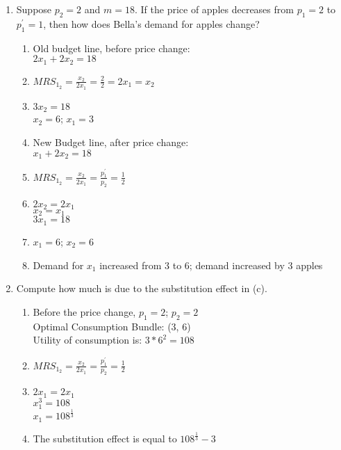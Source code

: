 \documentclass[11pt]{article}
\begin{document}
\begin{enumerate}
\begin{enumerate}
        \item Suppose $p_{2}=2$ and $m=18$. If the price of apples decreases from $p_{1}=2$ to $p_{1}^{\prime}=1$, then how does Bella's demand for apples change?
        \begin{enumerate}
            \item Old budget line, before price change:\\
            $2x_1 + 2x_2 = 18$
            \item $MRS_1_2 = \frac{x_2}{2x_1}=\frac{2}{2}=2x_1 = x_2$
            \item $3x_2 = 18$\\
            $x_2 = 6$; $x_1 = 3$
            \item New Budget line, after price change:\\
            $x_1 + 2x_2 = 18$
            \item $MRS_1_2 = \frac{x_2}{2x_1}=\frac{p_1^'}{p_2}=\frac{1}{2}$
            \item $2x_2 = 2x_1$\\$x_2 = x_1$\\
            $3x_1 = 18$
            \item $x_1 = 6$; $x_2 = 6$
            \item Demand for $x_1$ increased from 3 to 6; demand increased by 3 apples
        \end{enumerate}

        \item Compute how much is due to the substitution effect in (c).
        \begin{enumerate}
            \item Before the price change, $p_1 = 2$; $p_2 = 2$\\
            Optimal Consumption Bundle: (3, 6)\\
            Utility of consumption is: $3*6^2 = 108$
            \item $MRS_1_2 = \frac{x_2}{2x_1} = \frac{p_1^'}{p_2} = \frac{1}{2}$
            \item $2x_1 = 2x_1$\\
            $x_1^3 = 108$\\
            $x_1 = 108^{\frac{1}{3}}$
            \item The substitution effect is equal to $108^{\frac{1}{3}} - 3$
        \end{enumerate}

    \end{enumerate}



\end{enumerate}
\end{document}
